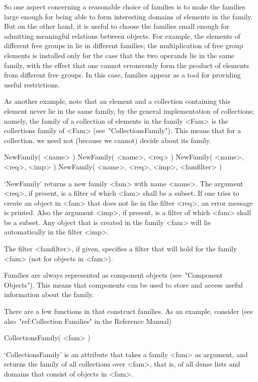 So one aspect concerning a reasonable choice of families is
to make the families large enough for being able to form interesting
domains of elements in the family.
But on the other hand,
it is useful to choose the families small enough for admitting
meaningful relations between objects.
For example, the elements of different free groups in {\GAP}
lie in different families;
the multiplication of free group elements is installed only for the
case that the two operands lie in the same family,
with the effect that one cannot erroneously form the product of
elements from different free groups.
In this case, families appear as a tool for providing useful
restrictions.

As another example, note that an element and a collection containing
this element never lie in the same family,
by the general implementation of collections;
namely, the family of a collection of elements in the family <Fam>
is the collections family of <Fam> (see~"CollectionsFamily").
This means that for a collection, we need not (because we cannot)
decide about its family.


\>NewFamily( <name> )
\)\fmark NewFamily( <name>, <req> )
\)\fmark NewFamily( <name>, <req>, <imp> )
\)\fmark NewFamily( <name>, <req>, <imp>, <famfilter> )

`NewFamily' returns a new family <fam> with name <name>.
The argument <req>, if present, is a filter of which <fam> shall be a
subset.
If one tries to create an object in <fam> that does not lie in the filter
<req>, an error message is printed.
Also the argument <imp>, if present,
is a filter of which <fam> shall be a subset.
Any object that is created in the family <fam> will lie automatically in
the filter <imp>.

The filter <famfilter>, if given, specifies a filter that will hold for the
family <fam> (not for objects in <fam>).

Families are always represented as component objects
(see~"Component Objects").
This means that components can be used to store and access
useful information about the family.

There are a few functions in {\GAP} that construct families.
As an example, consider
(see also~"ref:Collection Families" in the Reference Manual)

\>CollectionsFamily( <fam> )

`CollectionsFamily' is an attribute that takes a family <fam> as
argument, and returns the family of all collections over <fam>,
that is, of all dense lists and domains that consist of objects in
<fam>.

